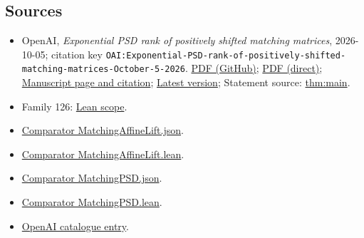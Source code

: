 \documentclass[11pt]{article}
\begin{document}
\subsection{Sources}
\begin{itemize}
\item OpenAI, \emph{Exponential PSD rank of positively shifted matching matrices}, 2026-10-05; citation key \texttt{OAI:Exponential-PSD-rank-of-positively-shifted-matching-matrices-October-5-2026}. \href{https://github.com/openai/math/blob/adc7f1241b42e322a6451854ab7e4b4c146bf78a/preprints/Exponential-PSD-rank-of-positively-shifted-matching-matrices-October-5-2026/shifted-matching-psd.pdf}{PDF (GitHub)}; \href{https://github.com/openai/math/raw/adc7f1241b42e322a6451854ab7e4b4c146bf78a/preprints/Exponential-PSD-rank-of-positively-shifted-matching-matrices-October-5-2026/shifted-matching-psd.pdf}{PDF (direct)}; \href{https://github.com/openai/math/blob/adc7f1241b42e322a6451854ab7e4b4c146bf78a/preprints/Exponential-PSD-rank-of-positively-shifted-matching-matrices-October-5-2026/README.md}{Manuscript page and citation}; \href{https://github.com/openai/math/blob/main/preprints/Exponential-PSD-rank-of-positively-shifted-matching-matrices-October-5-2026/shifted-matching-psd.pdf}{Latest version}; Statement source: \href{https://github.com/openai/math/blob/adc7f1241b42e322a6451854ab7e4b4c146bf78a/preprints/Exponential-PSD-rank-of-positively-shifted-matching-matrices-October-5-2026/build/source/sections/introduction.tex\#L37}{thm:main}.
\item Family 126: \href{https://github.com/openai/math/blob/adc7f1241b42e322a6451854ab7e4b4c146bf78a/lean/docs/126.md}{Lean scope}.
\item \href{https://github.com/openai/math/blob/adc7f1241b42e322a6451854ab7e4b4c146bf78a/lean/ComparatorChallenges/MatchingAffineLift.json}{Comparator MatchingAffineLift.json}.
\item \href{https://github.com/openai/math/blob/adc7f1241b42e322a6451854ab7e4b4c146bf78a/lean/ComparatorChallenges/MatchingAffineLift.lean}{Comparator MatchingAffineLift.lean}.
\item \href{https://github.com/openai/math/blob/adc7f1241b42e322a6451854ab7e4b4c146bf78a/lean/ComparatorChallenges/MatchingPSD.json}{Comparator MatchingPSD.json}.
\item \href{https://github.com/openai/math/blob/adc7f1241b42e322a6451854ab7e4b4c146bf78a/lean/ComparatorChallenges/MatchingPSD.lean}{Comparator MatchingPSD.lean}.
\item \href{https://github.com/openai/math/blob/adc7f1241b42e322a6451854ab7e4b4c146bf78a/CONTENTS.md}{OpenAI catalogue entry}.
\end{itemize}
\end{document}
